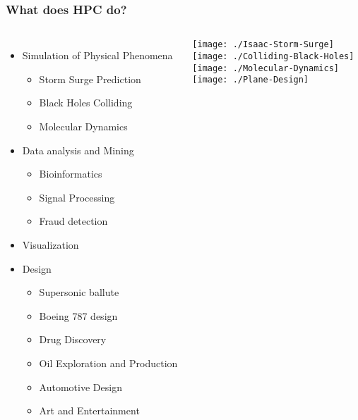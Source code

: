 \documentclass[slidestop,mathserif,compress,xcolor=svgnames,table]{beamer}
\begin{document}
\begin{frame}
  \frametitle{\small What does HPC do?}
  \begin{columns}
    \vspace{-1cm}
    \begin{itemize}
      \item Simulation of Physical Phenomena
      \begin{itemize}
        \item Storm Surge Prediction
        \item Black Holes Colliding
        \item Molecular Dynamics
      \end{itemize}
      \item Data analysis and Mining
      \begin{itemize}
        \item Bioinformatics
        \item Signal Processing
        \item Fraud detection
      \end{itemize}
      \item Visualization
      \item Design
      \begin{itemize}
        \item Supersonic ballute
        \item Boeing 787 design
        \item Drug Discovery
        \item Oil Exploration and Production
        \item Automotive Design
        \item Art and Entertainment
      \end{itemize}
    \end{itemize}
    \texttt{[image: ./Isaac-Storm-Surge]}\\
    \texttt{[image: ./Colliding-Black-Holes]}\\
    \texttt{[image: ./Molecular-Dynamics]}\\
    \texttt{[image: ./Plane-Design]}
  \end{columns}
\end{frame}
\end{document}
